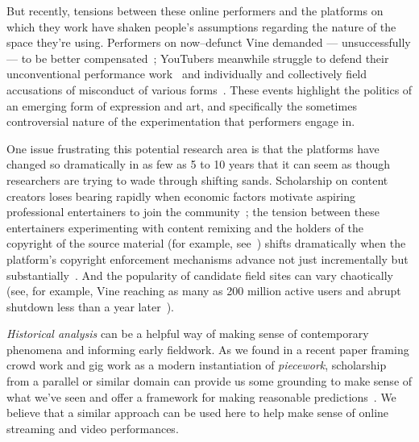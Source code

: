 \documentclass[10pt]{article}
\newcommand{\topic}[1]{{\color{Blue}#1}}
\renewcommand{\topic}[1]{{#1}}
\begin{document}
\topic{But recently, tensions between these online performers and the platforms on which they work have shaken people's
assumptions regarding the nature of the space they're using.}
Performers on now--defunct Vine demanded --- unsuccessfully --- to be better compensated~\cite{vineWantsMoney,vineInsiderMeeting};
YouTubers meanwhile struggle to defend their unconventional performance work~\cite{h3h3Lawsuit}
and individually and collectively field accusations of misconduct of various forms~\cite{youtubeDramaResponses}.
These events highlight the politics of an emerging form of expression and art,
and specifically the sometimes controversial nature of the experimentation that performers engage in.

\topic{One issue frustrating this potential research area is that
the platforms have changed so dramatically in as few as 5 to 10 years that
it can seem as though researchers are trying to wade through shifting sands.}
Scholarship on content creators loses bearing rapidly when
economic factors motivate aspiring professional entertainers to join the community~\cite{Hamilton:2014:STF:2611105.2557048};
the tension between these entertainers experimenting with content remixing and
the holders of the copyright of the source material
(for example, see~\cite{Hilderbrand48})
shifts dramatically when
the platform's copyright enforcement mechanisms advance
not just incrementally but substantially~\cite{kim2012institutionalization}.
And the popularity of candidate field sites can vary chaotically
(see, for example, Vine reaching as many as 200 million active users and
abrupt shutdown less than a year later~\cite{vineDecline}).

\topic{\textit{Historical analysis}
can be a helpful way of
making sense of contemporary phenomena and informing early fieldwork.}
As we found in a recent paper framing crowd work and gig work as a modern instantiation of \textit{piecework},
scholarship from a parallel or similar domain can
provide us some grounding to make sense of what we've seen and offer a framework for making reasonable predictions~\cite{pieceworkCrowdworkGigwork}.
We believe that a similar approach can be used here to help make sense of online streaming and video performances.
\end{document}
